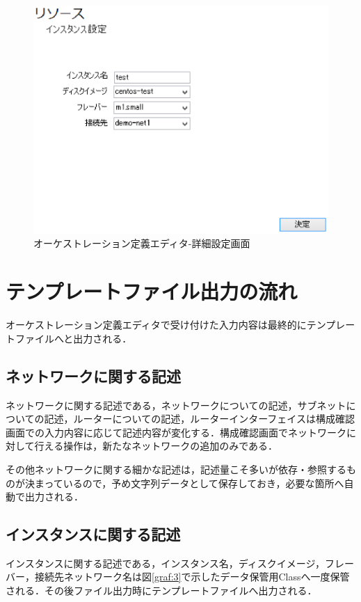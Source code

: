 \documentclass[mingoth]{kut-paper}		%
\begin{document}
			\begin{figure}[H]
				\begin{center}
					\includegraphics[scale=1.1]{Document/詳細設定画面.eps}
					\caption{オーケストレーション定義エディタ-詳細設定画面}
					\label{pic:4}
				\end{center}
			\end{figure}
	\section{テンプレートファイル出力の流れ}
	オーケストレーション定義エディタで受け付けた入力内容は最終的にテンプレートファイルへと出力される．
		\subsection{ネットワークに関する記述}
		ネットワークに関する記述である，ネットワークについての記述，サブネットについての記述，ルーターについての記述，ルーターインターフェイスは構成確認画面での入力内容に応じて記述内容が変化する．構成確認画面でネットワークに対して行える操作は，新たなネットワークの追加のみである．
		
		その他ネットワークに関する細かな記述は，記述量こそ多いが依存・参照するものが決まっているので，予め文字列データとして保存しておき，必要な箇所へ自動で出力される．
		\subsection{インスタンスに関する記述}
		インスタンスに関する記述である，インスタンス名，ディスクイメージ，フレーバー，接続先ネットワーク名は図\ref{graf:3}で示したデータ保管用Classへ一度保管される．その後ファイル出力時にテンプレートファイルへ出力される．
\end{document}
